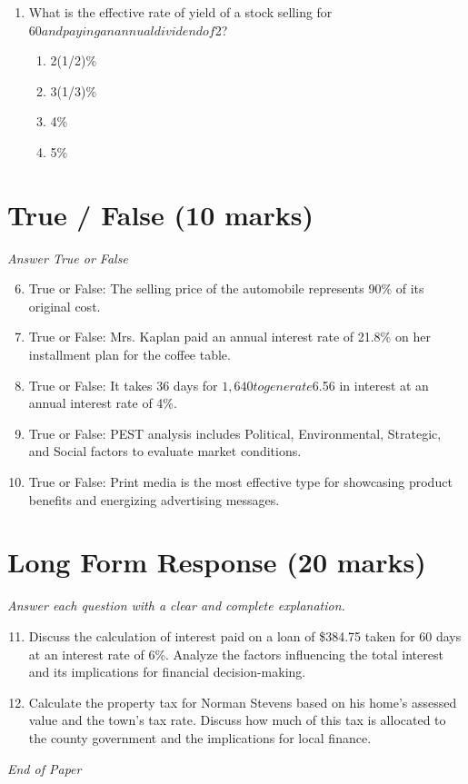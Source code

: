 \documentclass[12pt]{article}
\begin{document}
\begin{enumerate}[label=\arabic*.]
\begin{enumerate}[label=(\alph*)]
    \item \$1,200
    \item \$1,215.75
    \item \$1,230.50
    \item \$1,235.00
    \item \$1,242.50
\end{enumerate}
\item What is the effective rate of yield of a stock selling for $60 and paying an annual dividend of $2?
\begin{enumerate}[label=(\alph*)]
    \item 2(1/2)\%
    \item 3(1/3)\%
    \item 4\%
    \item 5\%
\end{enumerate}
\end{enumerate}

\section*{True / False (10 marks)}
\textit{Answer True or False}
\begin{enumerate}[label=\arabic*.]
\setcounter{enumi}{5}
\item True or False: The selling price of the automobile represents 90\% of its original cost.
\item True or False: Mrs. Kaplan paid an annual interest rate of 21.8\% on her installment plan for the coffee table.
\item True or False: It takes 36 days for $1,640 to generate $6.56 in interest at an annual interest rate of 4\%.
\item True or False: PEST analysis includes Political, Environmental, Strategic, and Social factors to evaluate market conditions.
\item True or False: Print media is the most effective type for showcasing product benefits and energizing advertising messages.
\end{enumerate}

\section*{Long Form Response (20 marks)}
\textit{Answer each question with a clear and complete explanation.}
\begin{enumerate}[label=\arabic*.]
\setcounter{enumi}{10}
\item Discuss the calculation of interest paid on a loan of \$384.75 taken for 60 days at an interest rate of 6\%. Analyze the factors influencing the total interest and its implications for financial decision-making.
\item Calculate the property tax for Norman Stevens based on his home's assessed value and the town's tax rate. Discuss how much of this tax is allocated to the county government and the implications for local finance.
\end{enumerate}

\vfill
\noindent\textit{End of Paper}
\end{document}
